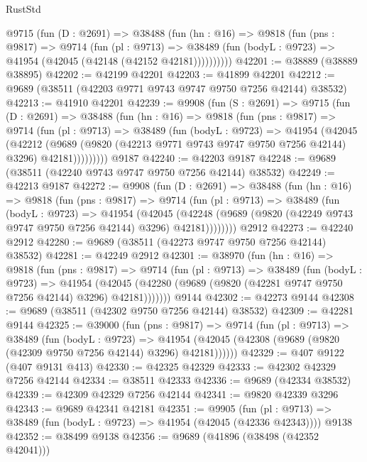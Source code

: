 \begin{lexlean}{RustStd}
\begin{coremodule}
      @9715
        (fun (D : @2691) =>
        @38488
          (fun (hn : @16) =>
          @9818
            (fun (pns : @9817) =>
            @9714
              (fun (pl : @9713) =>
              @38489 (fun (bodyL : @9723) => @41954 (@42045 (@42148 (@42152 @42181))))))))))
@42201 := @38889 (@38889 @38895)
@42202 := @42199 @42201
@42203 := @41899 @42201
@42212 := @9689 (@38511 (@42203 @9771 @9743 @9747 @9750 @7256 @42144) @38532)
@42213 := @41910 @42201
@42239 := @9908
    (fun (S : @2691) =>
    @9715
      (fun (D : @2691) =>
      @38488
        (fun (hn : @16) =>
        @9818
          (fun (pns : @9817) =>
          @9714
            (fun (pl : @9713) =>
            @38489
              (fun (bodyL : @9723) =>
              @41954
                (@42045
                  (@42212
                    (@9689
                      (@9820 (@42213 @9771 @9743 @9747 @9750 @7256 @42144) @3296)
                      @42181)))))))))
    @9187
@42240 := @42203 @9187
@42248 := @9689 (@38511 (@42240 @9743 @9747 @9750 @7256 @42144) @38532)
@42249 := @42213 @9187
@42272 := @9908
    (fun (D : @2691) =>
    @38488
      (fun (hn : @16) =>
      @9818
        (fun (pns : @9817) =>
        @9714
          (fun (pl : @9713) =>
          @38489
            (fun (bodyL : @9723) =>
            @41954
              (@42045
                (@42248 (@9689 (@9820 (@42249 @9743 @9747 @9750 @7256 @42144) @3296) @42181))))))))
    @2912
@42273 := @42240 @2912
@42280 := @9689 (@38511 (@42273 @9747 @9750 @7256 @42144) @38532)
@42281 := @42249 @2912
@42301 := @38970
    (fun (hn : @16) =>
    @9818
      (fun (pns : @9817) =>
      @9714
        (fun (pl : @9713) =>
        @38489
          (fun (bodyL : @9723) =>
          @41954
            (@42045 (@42280 (@9689 (@9820 (@42281 @9747 @9750 @7256 @42144) @3296) @42181)))))))
    @9144
@42302 := @42273 @9144
@42308 := @9689 (@38511 (@42302 @9750 @7256 @42144) @38532)
@42309 := @42281 @9144
@42325 := @39000
    (fun (pns : @9817) =>
    @9714
      (fun (pl : @9713) =>
      @38489
        (fun (bodyL : @9723) =>
        @41954 (@42045 (@42308 (@9689 (@9820 (@42309 @9750 @7256 @42144) @3296) @42181))))))
@42329 := @407 @9122 (@407 @9131 @413)
@42330 := @42325 @42329
@42333 := @42302 @42329 @7256 @42144
@42334 := @38511 @42333
@42336 := @9689 (@42334 @38532)
@42339 := @42309 @42329 @7256 @42144
@42341 := @9820 @42339 @3296
@42343 := @9689 @42341 @42181
@42351 := @9905
    (fun (pl : @9713) => @38489 (fun (bodyL : @9723) => @41954 (@42045 (@42336 @42343))))
    @9138
@42352 := @38499 @9138
@42356 := @9689 (@41896 (@38498 (@42352 @42041)))

\end{coremodule}
\end{lexlean}
